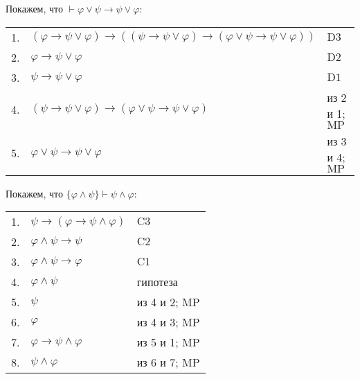 \documentclass[12pt,a4paper]{article}
\begin{document}
    \begin{example}
        Покажем, что $\vdash \varphi \vee \psi \rightarrow \psi \vee \varphi$:
        \begin{center}
            \begin{tabular}{rll}
                1.& $(\varphi \rightarrow \psi \vee \varphi) \rightarrow ((\psi \rightarrow \psi \vee \varphi) \rightarrow (\varphi \vee \psi \rightarrow \psi \vee \varphi))$& $\mathrm{D3}$\\
                2.& $\varphi \rightarrow \psi \vee \varphi$& $\mathrm{D2}$\\
                3.& $\psi \rightarrow \psi \vee \varphi$& $\mathrm{D1}$\\
                4.& $(\psi \rightarrow \psi \vee \varphi) \rightarrow (\varphi \vee \psi \rightarrow \psi \vee \varphi)$& из 2 и 1; $\mathrm{MP}$\\
                5.& $\varphi \vee \psi \rightarrow \psi \vee \varphi$& из 3 и 4; $\mathrm{MP}$\\
            \end{tabular}
        \end{center}
    \end{example}

    \begin{example}
        Покажем, что $\{\varphi \wedge \psi\} \vdash \psi \wedge \varphi$:
        \begin{center}
            \begin{tabular}{rll}
                1.& $\psi \rightarrow (\varphi \rightarrow \psi \wedge \varphi)$& $\mathrm{C3}$\\
                2.& $\varphi \wedge \psi \rightarrow \psi$& $\mathrm{C2}$\\
                3.& $\varphi \wedge \psi \rightarrow \varphi$& $\mathrm{C1}$\\
                4.& $\varphi \wedge \psi$& гипотеза\\
                5.& $\psi$& из 4 и 2; $\mathrm{MP}$\\
                6.& $\varphi$& из 4 и 3; $\mathrm{MP}$\\
                7.& $\varphi \rightarrow \psi \wedge \varphi$& из 5 и 1; $\mathrm{MP}$\\
                8.& $\psi \wedge \varphi$& из 6 и 7; $\mathrm{MP}$\\
            \end{tabular}
        \end{center}
    \end{example}
\end{document}
